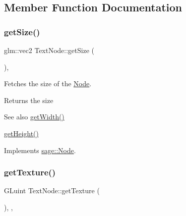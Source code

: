 \subsection{Member Function Documentation}
\mbox{\label{classsage_1_1TextNode_ac5aa86ad68f3470c50f7021695a6c45d}} 
\subsubsection{\texorpdfstring{getSize()}{getSize()}}
{\footnotesize\ttfamily glm\+::vec2 Text\+Node\+::get\+Size (\begin{DoxyParamCaption}{ }\end{DoxyParamCaption})\hspace{0.3cm}{\ttfamily [override]}, {\ttfamily [virtual]}}



Fetches the size of the \mbox{\hyperlink{classsage_1_1Node}{Node}}. 

\begin{DoxyReturn}{Returns}
the size 
\end{DoxyReturn}
\begin{DoxySeeAlso}{See also}
\mbox{\hyperlink{classsage_1_1Node_a65163ffabcfe9f482282ea37ead6fc5f}{get\+Width()}} 

\mbox{\hyperlink{classsage_1_1Node_a6af5a8378ac8d2c3490adbc2a03f1247}{get\+Height()}} 
\end{DoxySeeAlso}


Implements \mbox{\hyperlink{classsage_1_1Node_a286d3b5b0d16d31991b58cab972fb03b}{sage\+::\+Node}}.

\mbox{\label{classsage_1_1TextNode_ae21f17c6cb993692d8da89424b2581d7}} 
\subsubsection{\texorpdfstring{getTexture()}{getTexture()}}
{\footnotesize\ttfamily G\+Luint Text\+Node\+::get\+Texture (\begin{DoxyParamCaption}{ }\end{DoxyParamCaption})\hspace{0.3cm}{\ttfamily [override]}, {\ttfamily [protected]}, {\ttfamily [virtual]}}



